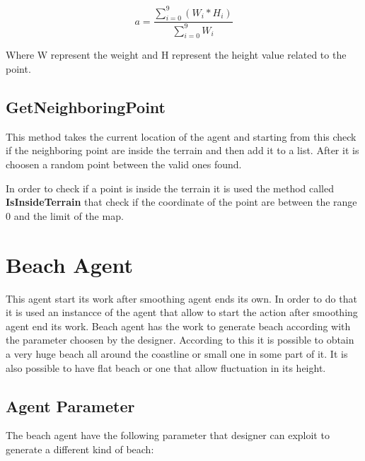 \documentclass[12pt]{article}
\begin{document}
    \begin{equation}
        a = \dfrac{\sum\limits_{i=0}^{9} (W_i * H_i) }{ \sum\limits_{i=0}^{9} W_i }
    \end{equation}

    \noindent
    Where W represent the weight and H represent the height value related to the point. 

    \subsection{GetNeighboringPoint}
    This method takes the current location of the agent and starting from this check if the neighboring point are inside the terrain and then add it to a list. After it is choosen a 
    random point between the valid ones found.

    In order to check if a point is inside the terrain it is used the method called \textbf{IsInsideTerrain} that check if the coordinate of the point are between the range 0 and
    the limit of the map.

    \section{Beach Agent}
    This agent start its work after smoothing agent ends its own. In order to do that it is used an instancce of the agent that allow to start the action after smoothing agent end its work.
    Beach agent has the work to generate beach according with the parameter choosen by the designer.
    According to this it is possible to obtain a very huge beach all around the coastline or small one in some part of it. It is also possible
    to have flat beach or one that allow fluctuation in its height.

    \subsection{Agent Parameter}
    The beach agent have the following parameter that designer can exploit to generate a different kind of beach:
\end{document}

